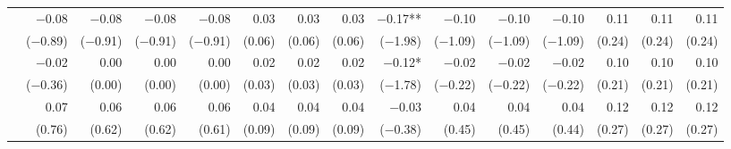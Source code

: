 \begin{tabularx}{1.45\textwidth}{lRRRRRRRRRRRRRR}
		 & \num{-0.08}\phantom{***)} & \num{-0.08}\phantom{***)} & \num{-0.08}\phantom{***)} & \num{-0.08}\phantom{***)} & \num{0.03}\phantom{***)} & \num{0.03}\phantom{***)} & \num{0.03}\phantom{***)} & \num{-0.17}**\phantom{*)} & \num{-0.10}\phantom{***)} & \num{-0.10}\phantom{***)} & \num{-0.10}\phantom{***)} & \num{0.11}\phantom{***)} & \num{0.11}\phantom{***)} & \num{0.11}\phantom{***)} \\
		 & (\num{-0.89})\phantom{***} & (\num{-0.91})\phantom{***} & (\num{-0.91})\phantom{***} & (\num{-0.91})\phantom{***} & (\num{0.06})\phantom{***} & (\num{0.06})\phantom{***} & (\num{0.06})\phantom{***} & (\num{-1.98})\phantom{***} & (\num{-1.09})\phantom{***} & (\num{-1.09})\phantom{***} & (\num{-1.09})\phantom{***} & (\num{0.24})\phantom{***} & (\num{0.24})\phantom{***} & (\num{0.24})\phantom{***} \\ [\dspacing]
		 & \num{-0.02}\phantom{***)} & \num{0.00}\phantom{***)} & \num{0.00}\phantom{***)} & \num{0.00}\phantom{***)} & \num{0.02}\phantom{***)} & \num{0.02}\phantom{***)} & \num{0.02}\phantom{***)} & \num{-0.12}*\phantom{**)} & \num{-0.02}\phantom{***)} & \num{-0.02}\phantom{***)} & \num{-0.02}\phantom{***)} & \num{0.10}\phantom{***)} & \num{0.10}\phantom{***)} & \num{0.10}\phantom{***)} \\
		 & (\num{-0.36})\phantom{***} & (\num{0.00})\phantom{***} & (\num{0.00})\phantom{***} & (\num{0.00})\phantom{***} & (\num{0.03})\phantom{***} & (\num{0.03})\phantom{***} & (\num{0.03})\phantom{***} & (\num{-1.78})\phantom{***} & (\num{-0.22})\phantom{***} & (\num{-0.22})\phantom{***} & (\num{-0.22})\phantom{***} & (\num{0.21})\phantom{***} & (\num{0.21})\phantom{***} & (\num{0.21})\phantom{***} \\ [\dspacing]
		 & \num{0.07}\phantom{***)} & \num{0.06}\phantom{***)} & \num{0.06}\phantom{***)} & \num{0.06}\phantom{***)} & \num{0.04}\phantom{***)} & \num{0.04}\phantom{***)} & \num{0.04}\phantom{***)} & \num{-0.03}\phantom{***)} & \num{0.04}\phantom{***)} & \num{0.04}\phantom{***)} & \num{0.04}\phantom{***)} & \num{0.12}\phantom{***)} & \num{0.12}\phantom{***)} & \num{0.12}\phantom{***)} \\
		 & (\num{0.76})\phantom{***} & (\num{0.62})\phantom{***} & (\num{0.62})\phantom{***} & (\num{0.61})\phantom{***} & (\num{0.09})\phantom{***} & (\num{0.09})\phantom{***} & (\num{0.09})\phantom{***} & (\num{-0.38})\phantom{***} & (\num{0.45})\phantom{***} & (\num{0.45})\phantom{***} & (\num{0.44})\phantom{***} & (\num{0.27})\phantom{***} & (\num{0.27})\phantom{***} & (\num{0.27})\phantom{***} \\ [\dspacing]

\end{tabularx}

